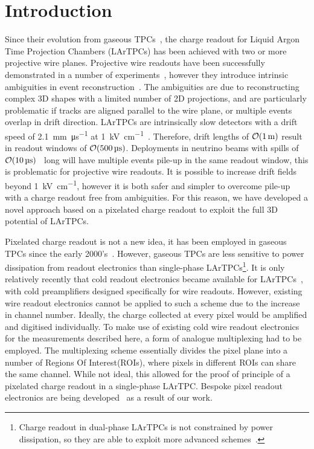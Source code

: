 \documentclass[instruments,article,submit,moreauthors,pdftex]{Definitions/mdpi}
\begin{document}

\section{Introduction} \label{sec:Intro}

Since their evolution from gaseous TPCs~\cite{TPC,LArIonize,LArTPC}, the charge readout for Liquid Argon Time Projection Chambers (LArTPCs) has been achieved with two or more projective wire planes. 
Projective wire readouts have been successfully demonstrated in a number of experiments~\cite{icarus,argonute,uboner}, however they introduce intrinsic ambiguities in event reconstruction~\cite{ambiguous}. 
The ambiguities are due to reconstructing complex 3D shapes with a limited number of 2D projections, and are particularly problematic if tracks are aligned parallel to the wire plane, or multiple events overlap in drift direction.    
LArTPCs are intrinsically slow detectors with a drift speed of \SI{2.1}{\milli\metre\per\micro\second} at \SI{1}{\kilo\volt\per\centi\metre}~\cite{protoLASER}.
Therefore, drift lengths of $\order{\SI{1}{\metre}}$ result in readout windows of $\order{\SI{500}{\micro\second}}$. 
Deployments in neutrino beams with spills of $\order{\SI{10}{\micro\second}}$~\cite{numi, DUNE3} long will have multiple events pile-up in the same readout window, this is problematic for projective wire readouts.
It is possible to increase drift fields beyond \SI{1}{\kilo\volt\per\centi\metre}\cite{breakdown_16, latex}, however it is both safer and simpler to overcome pile-up with a charge readout free from ambiguities. 
For this reason, we have developed a novel approach based on a pixelated charge readout to exploit the full 3D potential of LArTPCs.

Pixelated charge readout is not a new idea, it has been employed in gaseous TPCs since the early 2000's~\cite{gaspix}. 
However, gaseous TPCs are less sensitive to power dissipation from readout electronics than single-phase LArTPCs\footnote{Charge readout in dual-phase LArTPCs is not constrained by power dissipation, so they are able to exploit more advanced schemes~\cite{Far_Detectors}.}. 
It is only relatively recently that cold readout electronics became available for LArTPCs~\cite{larasic}, with cold preamplifiers designed specifically for wire readouts.  
However, existing wire readout electronics cannot be applied to such a scheme due to the increase in channel number.  
Ideally, the charge collected at every pixel would be amplified and digitised individually.
To make use of existing cold wire readout electronics for the measurements described here, a form of analogue multiplexing had to be employed.
The multiplexing scheme essentially divides the pixel plane into a number of Regions Of Interest(ROIs), where pixels in different ROIs can share the same channel.   
While not ideal, this allowed for the proof of principle of a pixelated charge readout in a single-phase LArTPC.   
Bespoke pixel readout electronics are being developed~\cite{larpix} as a result of our work.
\end{document}

